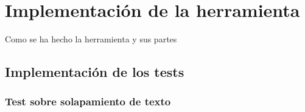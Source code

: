 \chapter{Implementación de la herramienta}
\label{cap:implementacion}

Como se ha hecho la herramienta y sus partes

\section{Implementación de los tests}
\subsection{Test sobre solapamiento de texto}
